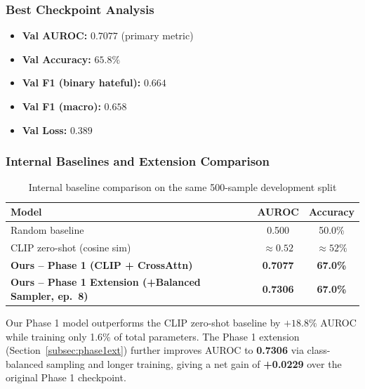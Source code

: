 \documentclass[12pt,a4paper]{article}
\begin{document}
\subsubsection{Best Checkpoint Analysis}

\begin{tcolorbox}[result, title={Best Model (saved at Epoch 9 by AUROC)}]
  \begin{itemize}
    \item \textbf{Val AUROC:} $0.7077$ \quad(primary metric)
    \item \textbf{Val Accuracy:} $65.8\%$
    \item \textbf{Val F1 (binary hateful):} $0.664$
    \item \textbf{Val F1 (macro):} $0.658$
    \item \textbf{Val Loss:} $0.389$
  \end{itemize}
\end{tcolorbox}

\subsubsection{Internal Baselines and Extension Comparison}

\begin{table}[H]
  \centering
  \caption{Internal baseline comparison on the same 500-sample development split}
  \renewcommand{\arraystretch}{1.3}
  \begin{tabular}{lcc}
    \toprule
    \rowcolor{primaryblue!15}
    \textbf{Model} & \textbf{AUROC} & \textbf{Accuracy} \\
    \midrule
    Random baseline                  & 0.500 & 50.0\% \\
    CLIP zero-shot (cosine sim)                                                    & $\approx0.52$   & $\approx52\%$ \\
    \midrule
    \rowcolor{successgreen!15}
    \textbf{Ours -- Phase 1 (CLIP + CrossAttn)}                                   & \textbf{0.7077} & \textbf{67.0\%} \\
    \rowcolor{successgreen!30}
    \textbf{Ours -- Phase 1 Extension (+Balanced Sampler, ep.~8)}                 & \textbf{0.7306} & \textbf{67.0\%} \\
    \bottomrule
  \end{tabular}
  \label{tab:baselines}
\end{table}

Our Phase 1 model outperforms the CLIP zero-shot baseline by $+18.8\%$ AUROC while training only 1.6\% of total parameters. The Phase 1 extension (Section~\ref{subsec:phase1ext}) further improves AUROC to \textbf{0.7306} via class-balanced sampling and longer training, giving a net gain of \textbf{+0.0229} over the original Phase 1 checkpoint.
\end{document}

